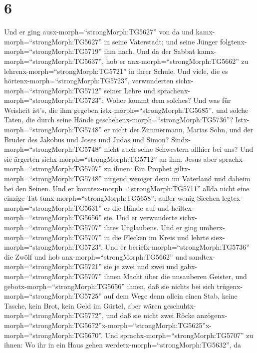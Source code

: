 \hypertarget{section-5}{%
\section{6}\label{section-5}}

 Und er ging ausx-morph=``strongMorph:TG5627'' von da und
kamx-morph=``strongMorph:TG5627'' in seine Vaterstadt; und seine Jünger
folgtenx-morph=``strongMorph:TG5719'' ihm nach.  Und da der
Sabbat kamx-morph=``strongMorph:TG5637'', hob er
anx-morph=``strongMorph:TG5662'' zu lehrenx-morph=``strongMorph:TG5721''
in ihrer Schule. Und viele, die es hörtenx-morph=``strongMorph:TG5723'',
verwunderten sichx-morph=``strongMorph:TG5712'' seiner Lehre und
sprachenx-morph=``strongMorph:TG5723'': Woher kommt dem solches? Und was
für Weisheit ist's, die ihm gegeben istx-morph=``strongMorph:TG5685'',
und solche Taten, die durch seine Hände
geschehenx-morph=``strongMorph:TG5736''? 
Istx-morph=``strongMorph:TG5748'' er nicht der Zimmermann, Marias Sohn,
und der Bruder des Jakobus und Joses und Judas und Simon?
Sindx-morph=``strongMorph:TG5748'' nicht auch seine Schwestern allhier
bei uns? Und sie ärgerten sichx-morph=``strongMorph:TG5712'' an ihm.
 Jesus aber sprachx-morph=``strongMorph:TG5707'' zu ihnen:
Ein Prophet giltx-morph=``strongMorph:TG5748'' nirgend weniger denn im
Vaterland und daheim bei den Seinen.  Und er
konntex-morph=``strongMorph:TG5711'' allda nicht eine einzige Tat
tunx-morph=``strongMorph:TG5658''; außer wenig Siechen
legtex-morph=``strongMorph:TG5631'' er die Hände auf und
heiltex-morph=``strongMorph:TG5656'' sie.  Und er
verwunderte sichx-morph=``strongMorph:TG5707'' ihres Unglaubens. Und er
ging umherx-morph=``strongMorph:TG5707'' in die Flecken im Kreis und
lehrte siex-morph=``strongMorph:TG5723''.  Und er
beriefx-morph=``strongMorph:TG5736'' die Zwölf und hob
anx-morph=``strongMorph:TG5662'' und
sandtex-morph=``strongMorph:TG5721'' sie je zwei und zwei und
gabx-morph=``strongMorph:TG5707'' ihnen Macht über die unsauberen
Geister,  und gebotx-morph=``strongMorph:TG5656'' ihnen, daß
sie nichts bei sich trügenx-morph=``strongMorph:TG5725'' auf dem Wege
denn allein einen Stab, keine Tasche, kein Brot, kein Geld im Gürtel,
 aber wären geschuhtx-morph=``strongMorph:TG5772'', und daß
sie nicht zwei Röcke
anzögenx-morph=``strongMorph:TG5672''\textbar x-morph=``strongMorph:TG5625''x-morph=``strongMorph:TG5670''.
 Und sprachx-morph=``strongMorph:TG5707'' zu ihnen: Wo ihr
in ein Haus gehen werdetx-morph=``strongMorph:TG5632'', da
